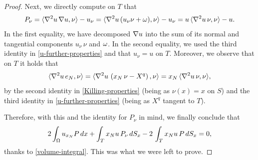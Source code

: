 \documentclass[a4paper,10pt]{amsart}
\numberwithin{equation}{section}
\begin{document}
\begin{proof}
%

\par
Next, we directly compute on $T$ that
$$
P_\nu = \langle \nabla^2 u \, \nabla u, \nu\rangle - u_\nu =\langle \nabla^2 u \, (u_\nu \nu+\omega), \nu\rangle - u_\nu= 
 u \,\langle\nabla^2 u \, \nu, \nu\rangle - u.
$$
In the first equality, we have decomposed $\nabla u$ into the sum of its normal and tangential components $u_\nu\,\nu$ and $\omega$. In the second equality, we used the third identity in \eqref{u-further-properties} and 
that $u_\nu = u$ on $T$.
Moreover, we observe that on $T$ it holds that
$$
\langle \nabla^2 u\,e_N, \nu\rangle=\langle \nabla^2 u\, \left(  x_N \, \nu - X^q \right) , \nu\rangle=x_N\,\langle\nabla^2 u \, \nu, \nu\rangle,
$$
by the second identity in \eqref{Killing-properties} (being as $\nu(x)=x$ on $S$) and the third identity in \eqref{u-further-properties} (being as $X^q$ tangent to $T$).
\par
Therefore, with this and the identity for $P_\nu$ in mind, we finally conclude that
$$
2 \int_\Omega u_{x_N}  P \, dx+\int_T x_N u \, P_\nu\,dS_x-2\,\int_T x_N u\, P \, dS_x=0,
$$
thanks to
\eqref{volume-integral}. This was what we were left to prove.
\end{proof}
\end{document}
